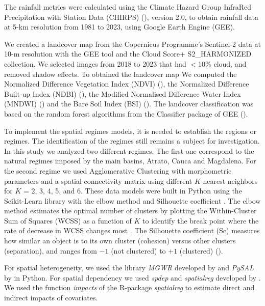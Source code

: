 \documentclass[
  manuscript=article,  
  layout=preprint,  
  year=2023,
  volume=0,
]{format}
\begin{document}
\par The rainfall metrics were calculated using the Climate Hazard Group InfraRed Precipitation with Station Data (CHIRPS) (\cite{funk2015}), version 2.0, to obtain rainfall data at 5-km resolution from 1981 to 2023, using Google Earth Engine (GEE).

\par We created a landcover map from the Copernicus Programme's Sentinel-2 data at 10-m resolution with the GEE tool and the Cloud Score+ S2\_HARMONIZED collection. We selected images from 2018 to 2023 that had $<$10\% cloud, and removed shadow effects. To obtained the landcover map We computed the Normalized Difference Vegetation Index (NDVI)  (\cite{kriegler1969}), the Normalized Difference Built-up Index (NDBI) (\cite{zha2003}), the Modified Normalised Difference Water Index (MNDWI) (\cite{xu2006}) and the Bare Soil Index (BSI) (\cite{li2014}). The landcover classification was based on the random forest algorithms from the Classifier package of GEE (\cite{breiman2001}).

\par To implement the spatial regimes models, it is needed to establish the regions or regimes. The identification of the regimes still remains a subject for investigation. In this study we analyzed two different regimes. The first one correspond to the natural regimes imposed by the main basins, Atrato, Cauca and Magdalena. For the second regime we used Agglomerative Clustering with morphometric parameters and a spatial connectivity matrix using different $K$-nearest neighbors for $K$ = 2, 3, 4, 5, and 6. These data models were built in Python using the Scikit-Learn library with the elbow method and Silhouette coefficient \cite{scikit-learn2011}. The elbow method estimates the optimal number of clusters by plotting the Within-Cluster Sum of Squares (WCSS) as a function of $K$ to identify the break point where the rate of decrease in WCSS changes most \cite{thorndike1953}. The Silhouette coefficient (Sc) measures how similar an object is to its own cluster (cohesion) versus other clusters (separation), and ranges from $-1$ (not clustered) to $+1$ (clustered) (\cite{rousseeuw1987}). 

\par For spatial heterogeneity, we used the library \textit{MGWR} developed by \cite{mgwr2019, oshan2019mgwr} and \textit{PySAL} by \cite{pysal2007} in Python. For spatial dependency we used \textit{spdep} and \textit{spatialreg} developed by \cite{bivand2022}. We used the function \textit{impacts} of the R-package \textit{spatialreg} to estimate direct and indirect impacts of covariates.
\end{document}
